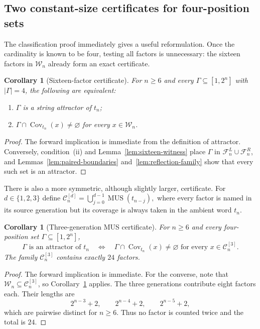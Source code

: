 \documentclass[11pt,a4paper]{article}
\newtheorem{corollary}[theorem]{Corollary}
\theoremstyle{definition}\newtheorem{definition}[theorem]{Definition}
\theoremstyle{remark}\newtheorem{remark}[theorem]{Remark}
\newcommand{\Cov}{\operatorname{Cov}}
\newcommand{\MUS}{\operatorname{MUS}}
\newcommand{\FL}{\mathcal{F}^{L}}
\newcommand{\FR}{\mathcal{F}^{R}}
\begin{document}
\subsection{Two constant-size certificates for four-position sets}
\label{subsec:constant-certificates}

The classification proof immediately gives a useful reformulation.  Once the cardinality is known to be four, testing all factors is unnecessary: the sixteen factors in $\mathcal W_n$ already form an exact certificate.

\begin{corollary}[Sixteen-factor certificate]
\label{cor:sixteen-certificate}
For $n\ge6$ and every $\Gamma\subseteq[1,2^n]$ with $|\Gamma|=4$, the following are equivalent:
\begin{enumerate}[label=(\roman*),leftmargin=*]
\item $\Gamma$ is a string attractor of $t_n$;
\item $\Gamma\cap\Cov_{t_n}(x)\ne\varnothing$ for every $x\in\mathcal W_n$.
\end{enumerate}
\end{corollary}

\begin{proof}
The forward implication is immediate from the definition of attractor.  Conversely, condition~(ii) and Lemma~\ref{lem:sixteen-witness} place $\Gamma$ in $\FL_n\cup\FR_n$, and Lemmas~\ref{lem:paired-boundaries} and~\ref{lem:reflection-family} show that every such set is an attractor.
\end{proof}

There is also a more symmetric, although slightly larger, certificate.  For $d\in\{1,2,3\}$ define
$
 \mathcal C_n^{[d]}=\bigcup_{j=0}^{d-1}\MUS(t_{n-j}),
$
where every factor is named in its source generation but its coverage is always taken in the ambient word $t_n$.

\begin{corollary}[Three-generation MUS certificate]
\label{cor:three-generation}
For $n\ge6$ and every four-position set $\Gamma\subseteq[1,2^n]$,
\[
 \Gamma\text{ is an attractor of }t_n
 \quad\Longleftrightarrow\quad
 \Gamma\cap\Cov_{t_n}(x)\ne\varnothing
 \text{ for every }x\in\mathcal C_n^{[3]}.
\]
The family $\mathcal C_n^{[3]}$ contains exactly $24$ factors.
\end{corollary}

\begin{proof}
The forward implication is immediate.  For the converse, note that $\mathcal W_n\subseteq\mathcal C_n^{[3]}$, so Corollary~\ref{cor:sixteen-certificate} applies.  The three generations contribute eight factors each.  Their lengths are
\[
 2^{n-3}+2,\qquad 2^{n-4}+2,\qquad 2^{n-5}+2,
\]
which are pairwise distinct for $n\ge6$.  Thus no factor is counted twice and the total is $24$.
\end{proof}
\end{document}

